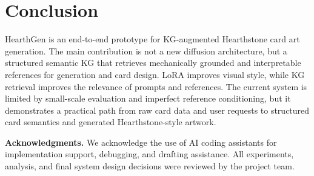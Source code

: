 \documentclass[10pt,twocolumn,letterpaper]{article}
\begin{document}
\section{Conclusion}

HearthGen is an end-to-end prototype for KG-augmented Hearthstone card art generation. The main contribution is not a new diffusion architecture, but a structured semantic KG that retrieves mechanically grounded and interpretable references for generation and card design. LoRA improves visual style, while KG retrieval improves the relevance of prompts and references. The current system is limited by small-scale evaluation and imperfect reference conditioning, but it demonstrates a practical path from raw card data and user requests to structured card semantics and generated Hearthstone-style artwork.

\noindent
{\bf Acknowledgments.} We acknowledge the use of AI coding assistants for implementation support, debugging, and drafting assistance. All experiments, analysis, and final system design decisions were reviewed by the project team.

{\small


}
\end{document}
